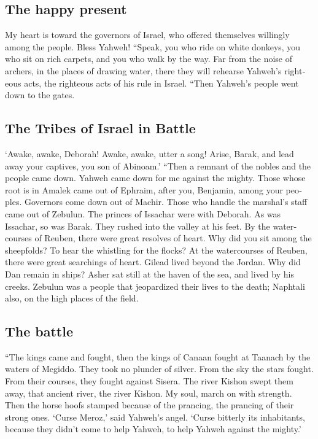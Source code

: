 \begin{paracol}{2}
\begin{otherlanguage}{english}
\hypertarget{the-happy-present}{%
\subsection{The happy present}\label{the-happy-present}}

 My heart is toward the governors of Israel, who offered
themselves willingly among the people. Bless Yahweh! 
``Speak, you who ride on white donkeys, you who sit on rich carpets, and
you who walk by the way.  Far from the noise of archers,
in the places of drawing water, there they will rehearse Yahweh's
righteous acts, the righteous acts of his rule in Israel. ``Then
Yahweh's people went down to the gates.

\hypertarget{the-tribes-of-israel-in-battle}{%
\subsection{The Tribes of Israel in
Battle}\label{the-tribes-of-israel-in-battle}}

 `Awake, awake, Deborah! Awake, awake, utter a song!
Arise, Barak, and lead away your captives, you son of Abinoam.'
 ``Then a remnant of the nobles and the people came down.
Yahweh came down for me against the mighty.  Those whose
root is in Amalek came out of Ephraim, after you, Benjamin, among your
peoples. Governors come down out of Machir. Those who handle the
marshal's staff came out of Zebulun.  The princes of
Issachar were with Deborah. As was Issachar, so was Barak. They rushed
into the valley at his feet. By the watercourses of Reuben, there were
great resolves of heart.  Why did you sit among the
sheepfolds? To hear the whistling for the flocks? At the watercourses of
Reuben, there were great searchings of heart.  Gilead
lived beyond the Jordan. Why did Dan remain in ships? Asher sat still at
the haven of the sea, and lived by his creeks.  Zebulun
was a people that jeopardized their lives to the death; Naphtali also,
on the high places of the field.

\hypertarget{the-battle}{%
\subsection{The battle}\label{the-battle}}

 ``The kings came and fought, then the kings of Canaan
fought at Taanach by the waters of Megiddo. They took no plunder of
silver.  From the sky the stars fought. From their
courses, they fought against Sisera.  The river Kishon
swept them away, that ancient river, the river Kishon. My soul, march on
with strength.  Then the horse hoofs stamped because of
the prancing, the prancing of their strong ones.  `Curse
Meroz,' said Yahweh's angel. `Curse bitterly its inhabitants, because
they didn't come to help Yahweh, to help Yahweh against the mighty.'


\end{otherlanguage}
\end{paracol}
